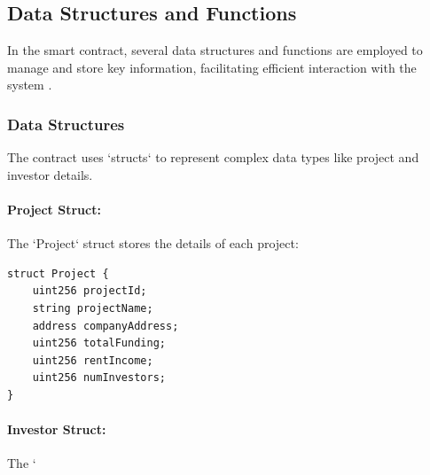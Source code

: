 \subsection{Data Structures and Functions}

In the smart contract, several data structures and functions are employed to manage and store key information, facilitating efficient interaction with the system \cite{Dannen2017SoliditySmartContracts}.

\subsubsection{Data Structures}

The contract uses `structs` to represent complex data types like project and investor details.

\paragraph{Project Struct:}
The `Project` struct stores the details of each project:
\begin{verbatim}
struct Project {
    uint256 projectId;
    string projectName;
    address companyAddress;
    uint256 totalFunding;
    uint256 rentIncome;
    uint256 numInvestors;
}
\end{verbatim}

\paragraph{Investor Struct:}
The `